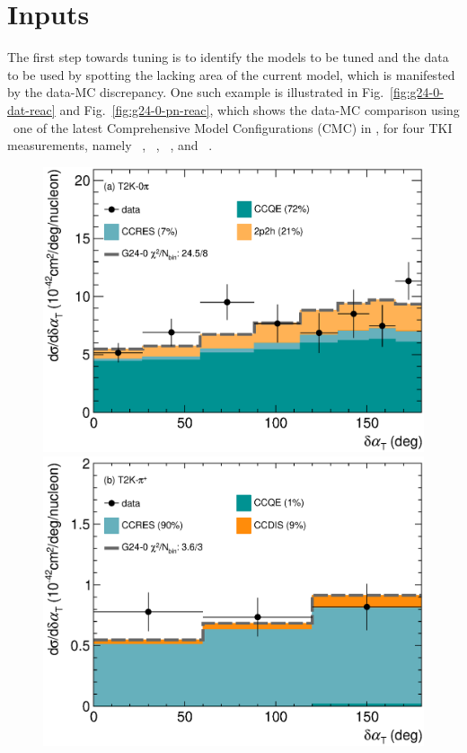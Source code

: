 \section{Inputs}
The first step towards tuning is to identify the models to be tuned and the data to be used by spotting the lacking area of the current model, which is manifested by the data-MC discrepancy.
One such example is illustrated in Fig.~\ref{fig:g24-0-dat-reac} and Fig.~\ref{fig:g24-0-pn-reac}, which shows the data-MC comparison using \newtune\, one of the latest Comprehensive Model Configurations (CMC) in \genie, for four TKI measurements, namely \ttkzpi~\cite{T2K:2018rnz}, \ttkpip~\cite{T2K:2021naz}, \minzpi~\cite{MINERvA:2018hba, MINERvA:2019ope}, and \minpiz~\cite{MINERvA:2020anu}. 
\begin{figure} 
    \centering 		
    \includegraphics[width=\dbfigwid\textwidth]{figures/tuning/0000-t2k_0pi_dalphat_reac_decomp.eps} 
    \includegraphics[width=\dbfigwid\textwidth]{figures/tuning/0000-t2k_pip_dalphat_reac_decomp.eps} 

\end{figure}
